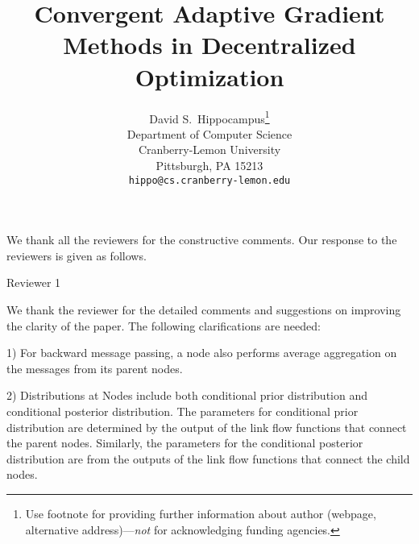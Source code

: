 \documentclass{article} %
\title{Convergent Adaptive Gradient Methods in Decentralized Optimization\vspace{-0.15in}}
\begin{document}
\maketitle


\author{%
  David S.~Hippocampus\thanks{Use footnote for providing further information
    about author (webpage, alternative address)---\emph{not} for acknowledging
    funding agencies.} \\
  Department of Computer Science\\
  Cranberry-Lemon University\\
  Pittsburgh, PA 15213 \\
  \texttt{hippo@cs.cranberry-lemon.edu} \\
}



We thank all the reviewers for the constructive comments. Our response to the reviewers is given as follows.

Reviewer 1

We thank the reviewer for the detailed comments and suggestions on improving the clarity of the paper.
The following clarifications are needed:

1) For backward message passing, a node also performs average aggregation on the messages from its parent nodes.

2) Distributions at Nodes include both conditional prior distribution and conditional posterior distribution. The parameters for conditional prior distribution are determined by the output of the link flow functions that connect the parent nodes. Similarly, the parameters for the conditional posterior distribution are from the outputs of the link flow functions that connect the child nodes.
\end{document}
